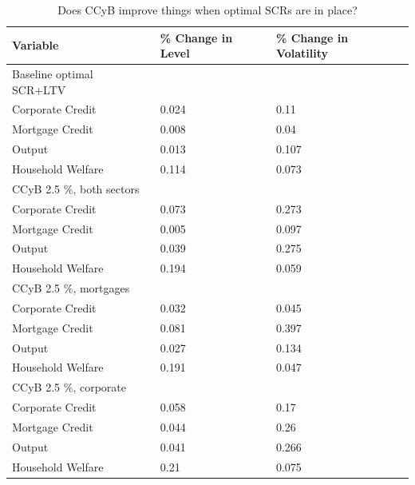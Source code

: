 \documentclass[12pt]{article}
\numberwithin{equation}{section}
\begin{document}
\begin{table}[h]
\caption{Does CCyB improve things when optimal SCRs are in place?}
\begin{tabular}{l|l|l}
\small
Variable & \% Change in Level & \% Change in Volatility \\
\hline
Baseline optimal SCR+LTV & & \\
\hline
    Corporate Credit           &       0.024   &      0.11 \\
    Mortgage Credit            &      0.008    &      0.04 \\
    Output         				&     0.013    &      0.107 \\ 
    Household Welfare       &         0.114     &     0.073\\
\hline
CCyB 2.5 \%, both sectors & & \\
\hline
    Corporate Credit           &       0.073    &     0.273 \\
    Mortgage Credit            &      0.005    &      0.097 \\
    Output         				&     0.039    &     0.275 \\ 
    Household Welfare       &     0.194     &     0.059\\
\hline
CCyB 2.5 \%, mortgages  & & \\
\hline
    Corporate Credit           &       0.032    &     0.045 \\
    Mortgage Credit            &      0.081   &      0.397 \\
    Output         				&     0.027    &     0.134 \\ 
    Household Welfare       &     0.191     &     0.047\\
 \hline
CCyB 2.5 \%, corporate  & & \\
\hline
    Corporate Credit           &       0.058    &     0.17 \\
    Mortgage Credit            &      0.044    &      0.26 \\
    Output         				&     0.041    &    0.266 \\ 
    Household Welfare       &     0.21     &     0.075\\   

\end{tabular}
\end{table}
\end{document}
